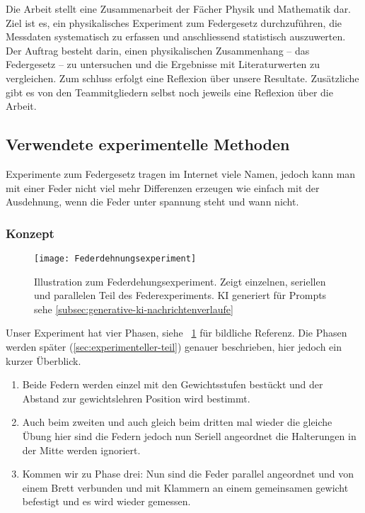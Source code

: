 \documentclass[../main.tex]{subfiles} %
\begin{document}
        Die Arbeit stellt eine Zusammenarbeit der Fächer Physik und Mathematik dar.
        Ziel ist es, ein physikalisches Experiment zum Federgesetz durchzuführen, die Messdaten systematisch zu erfassen und anschliessend statistisch auszuwerten.
        Der Auftrag besteht darin, einen physikalischen Zusammenhang – das Federgesetz – zu untersuchen und die Ergebnisse mit Literaturwerten zu vergleichen.
        Zum schluss erfolgt eine Reflexion über unsere Resultate.
        Zusätzliche gibt es von den Teammitgliedern selbst noch jeweils eine Reflexion über die Arbeit.


    \subsection{Verwendete experimentelle Methoden}\label{subsec:verwendete-experimentelle-methoden}

        Experimente zum Federgesetz tragen im Internet viele Namen, jedoch kann man mit einer Feder nicht viel mehr Differenzen
        erzeugen wie einfach mit der Ausdehnung, wenn die Feder unter spannung steht und wann nicht.

        \subsubsection{Konzept}\label{subsubsec:konzept}

            \begin{figure}[ht]
                \centering
                \texttt{[image: Federdehnungsexperiment]}
                \caption{Illustration zum Federdehungsexperiment. Zeigt einzelnen, seriellen und parallelen Teil des Federexperiments. KI generiert für Prompts sehe \ref{subsec:generative-ki-nachrichtenverlaufe}}
                \label{fig:mesh1}
            \end{figure}

            \noindent Unser Experiment hat vier Phasen, siehe ~\ref{fig:mesh1} für bildliche Referenz.
            Die Phasen werden später (\ref{sec:experimenteller-teil}) genauer beschrieben, hier jedoch ein kurzer Überblick.
            \begin{enumerate}
                \item Beide Federn werden einzel mit den Gewichtsstufen bestückt und der Abstand zur gewichtslehren Position wird bestimmt.
                \item Auch beim zweiten und auch gleich beim dritten mal wieder die gleiche Übung hier sind die Federn jedoch nun Seriell angeordnet die Halterungen in der Mitte werden ignoriert.
                \item Kommen wir zu Phase drei: Nun sind die Feder parallel angeordnet und von einem Brett verbunden und mit Klammern an einem gemeinsamen gewicht befestigt und es wird wieder gemessen.
            \end{enumerate}
\end{document}
